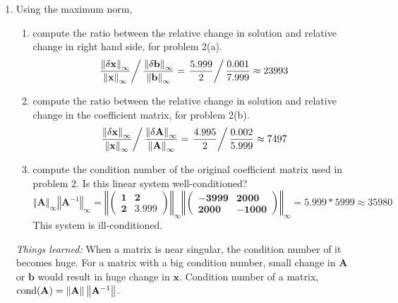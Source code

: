 \documentclass[10pt]{report}
\newcommand{\norm}[2][\infty] {\left\Vert \mathbf{#2} \right\Vert_#1}
\begin{document}
\begin{enumerate}
	\item 
	Using the maximum norm,
	\begin{enumerate}
		\item 
		compute the ratio between the relative change in solution and relative change in right hand side, for problem 2(a).
		\[
		\left.\frac{\norm{\delta x}}{\norm{x}}\right/\frac{\norm{\delta b}}{\norm{b}}
		= \left.\frac{5.999}{2}\right/\frac{0.001}{7.999}
		\approx 23993
		\]
		
		\item 
		compute the ratio between the relative change in solution and relative change in the coefficient matrix, for problem 2(b).
		\[
		\left.\frac{\norm{\delta x}}{\norm{x}}\right/\frac{\norm{\delta A}}{\norm{A}}
		= \left.\frac{4.995}{2}\right/\frac{0.002}{5.999}
		\approx 7497
		\]
		
		\item 
		compute the condition number of the original coefficient matrix used in problem 2. Is this linear system well-conditioned?
		\[
		\norm{A}\norm{A^\mathrm{-1}} 
			= \norm{\begin{pmatrix}
			1 & 2\\ 2 & 3.999
			\end{pmatrix}} 
			\norm{\begin{pmatrix}
				-3999 & 2000\\ 2000 & -1000
				\end{pmatrix}} 
			= 5.999 * 5999 \approx 35980
		\]
		This system is ill-conditioned.
	\end{enumerate}
	\textit{Things learned:} When a matrix is near singular, the condition number of it becomes huge. For a matrix with a big condition number, small change in $\mathbf{A}$ or $\mathbf{b}$ would result in huge change in $\mathbf{x}$. Condition number of a matrix, $\text{cond}(\bf A) = \left\Vert \mathbf{A}\right\Vert \left\Vert \mathbf{A}^{\rm -1}\right\Vert$.
	

\end{enumerate}
\end{document}
